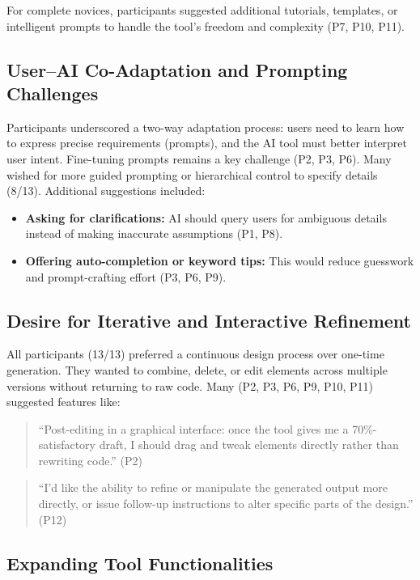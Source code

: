 For complete novices, participants suggested additional tutorials, templates, or intelligent prompts to handle the tool's freedom and complexity (P7, P10, P11).

\subsection{User–AI Co-Adaptation and Prompting Challenges}
Participants underscored a two-way adaptation process: users need to learn how to express precise requirements (prompts), and the AI tool must better interpret user intent. Fine-tuning prompts remains a key challenge (P2, P3, P6). Many wished for more guided prompting or hierarchical control to specify details (8/13). Additional suggestions included:

\begin{itemize}
    \item \textbf{Asking for clarifications:} AI should query users for ambiguous details instead of making inaccurate assumptions (P1, P8).
    \item \textbf{Offering auto-completion or keyword tips:} This would reduce guesswork and prompt-crafting effort (P3, P6, P9).
\end{itemize}

\subsection{Desire for Iterative and Interactive Refinement}
All participants (13/13) preferred a continuous design process over one-time generation. They wanted to combine, delete, or edit elements across multiple versions without returning to raw code. Many (P2, P3, P6, P9, P10, P11) suggested features like:

\begin{quote}
``Post-editing in a graphical interface: once the tool gives me a 70\%-satisfactory draft, I should drag and tweak elements directly rather than rewriting code.'' (P2)
\end{quote}

\begin{quote}
``I'd like the ability to refine or manipulate the generated output more directly, or issue follow-up instructions to alter specific parts of the design.'' (P12)
\end{quote}

\subsection{Expanding Tool Functionalities}
